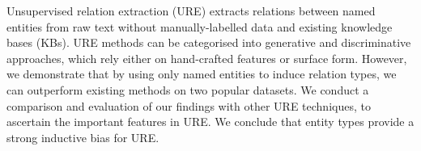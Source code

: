 Unsupervised relation extraction (URE) extracts relations between named entities from raw text without manually-labelled data and existing knowledge bases (KBs). URE methods can be categorised into generative and discriminative approaches, which rely either on hand-crafted features or surface form. However, we demonstrate that by using only named entities to induce relation types, we can outperform existing methods on two popular datasets. We conduct a comparison and evaluation of our findings with other URE techniques, to ascertain the important features in URE. We conclude that entity types provide a strong inductive bias for URE.
